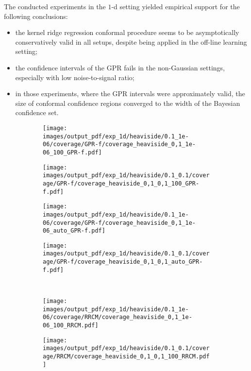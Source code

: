 \documentclass[a4paper,14pt]{extarticle}
\begin{document}
The conducted experiments in the $1$-d setting yielded empirical support for the
following conclusions:
\begin{itemize}
  \item the kernel ridge regression conformal procedure seems to be asymptotically
  conservatively valid in all setups, despite being applied in the off-line learning
  setting;
  \item  the confidence intervals of the GPR fails in the non-Gaussian settings,
  especially with low noise-to-signal ratio;
  \item in those experiments, where the GPR intervals were approximately valid, the
  size of conformal confidence regions converged to the width of the Bayesian confidence
  set.
\end{itemize}

\begin{figure}%
  \centering
  \begin{subfigure}[b]{0.25\linewidth}
    \texttt{[image: images/output\_pdf/exp\_1d/heaviside/0.1\_1e-06/coverage/GPR-f/coverage\_heaviside\_0,1\_1e-06\_100\_GPR-f.pdf]}
  \end{subfigure}%
  \begin{subfigure}[b]{0.25\linewidth}
    \texttt{[image: images/output\_pdf/exp\_1d/heaviside/0.1\_0.1/coverage/GPR-f/coverage\_heaviside\_0,1\_0,1\_100\_GPR-f.pdf]}
  \end{subfigure}%
  \begin{subfigure}[b]{0.25\linewidth}
    \texttt{[image: images/output\_pdf/exp\_1d/heaviside/0.1\_1e-06/coverage/GPR-f/coverage\_heaviside\_0,1\_1e-06\_auto\_GPR-f.pdf]}
  \end{subfigure}%
  \begin{subfigure}[b]{0.25\linewidth}
    \texttt{[image: images/output\_pdf/exp\_1d/heaviside/0.1\_0.1/coverage/GPR-f/coverage\_heaviside\_0,1\_0,1\_auto\_GPR-f.pdf]}
  \end{subfigure}\\
  \begin{subfigure}[b]{0.25\linewidth}
    \texttt{[image: images/output\_pdf/exp\_1d/heaviside/0.1\_1e-06/coverage/RRCM/coverage\_heaviside\_0,1\_1e-06\_100\_RRCM.pdf]}
  \end{subfigure}%
  \begin{subfigure}[b]{0.25\linewidth}
    \texttt{[image: images/output\_pdf/exp\_1d/heaviside/0.1\_0.1/coverage/RRCM/coverage\_heaviside\_0,1\_0,1\_100\_RRCM.pdf]}

\end{subfigure}
\end{figure}
\end{document}
